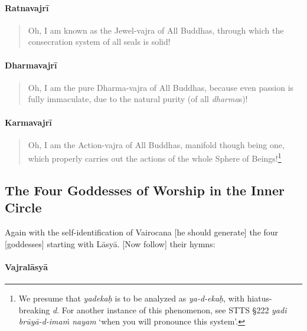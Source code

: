 \documentclass[11pt]{book}
\newcommand{\skt}[1]{\emph{#1}}
\begin{document}
\paragraph{Ratnavajrī}

\begin{verse}
Oh, I am known as the Jewel-vajra of All Buddhas, through which the consecration system of all seals is solid!
\end{verse}

\paragraph{Dharmavajrī}

\begin{verse}
Oh, I am the pure Dharma-vajra of All Buddhas, because even passion is fully immaculate, due to the natural purity (of all \skt{dharma}s)!
\end{verse}

\paragraph{Karmavajrī}

\begin{verse}
Oh, I am the Action-vajra of All Buddhas, manifold though being one, which properly carries out the actions of the whole Sphere of Beings!\footnote{We presume that \skt{yadekaḥ} is to be analyzed as \skt{ya-d-ekaḥ}, with hiatus-breaking \skt{d}. For another instance of this phenomenon, see STTS §222 \skt{yadi brūyā-d-imaṁ nayam} `when you will pronounce this system'.}\\
\end{verse}

\subsection{The Four Goddesses of Worship in the Inner Circle}

Again with the self-identification of Vairocana [he should generate] the four [goddesses] starting with Lāsyā. [Now follow] their hymns:

\paragraph{Vajralāsyā}
\end{document}
